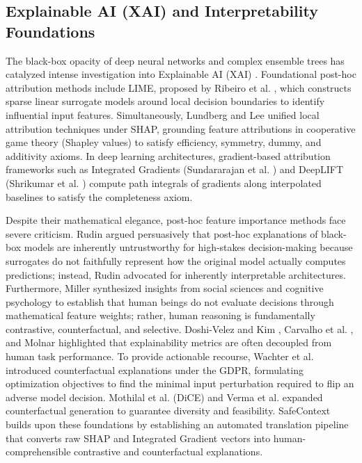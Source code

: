 \documentclass[journal]{IEEEtran}
\begin{document}
\subsection{Explainable AI (XAI) and Interpretability Foundations}
The black-box opacity of deep neural networks and complex ensemble trees has catalyzed intense investigation into Explainable AI (XAI) \cite{arrieta2020explainable, guidotti2018survey, adadi2018peeking}. Foundational post-hoc attribution methods include LIME, proposed by Ribeiro et al. \cite{ribeiro2016should}, which constructs sparse linear surrogate models around local decision boundaries to identify influential input features. Simultaneously, Lundberg and Lee \cite{lundberg2017unified} unified local attribution techniques under SHAP, grounding feature attributions in cooperative game theory (Shapley values) to satisfy efficiency, symmetry, dummy, and additivity axioms. In deep learning architectures, gradient-based attribution frameworks such as Integrated Gradients (Sundararajan et al. \cite{sundararajan2017axiomatic}) and DeepLIFT (Shrikumar et al. \cite{shrikumar2017learning}) compute path integrals of gradients along interpolated baselines to satisfy the completeness axiom.

Despite their mathematical elegance, post-hoc feature importance methods face severe criticism. Rudin \cite{rudin2019stop} argued persuasively that post-hoc explanations of black-box models are inherently untrustworthy for high-stakes decision-making because surrogates do not faithfully represent how the original model actually computes predictions; instead, Rudin advocated for inherently interpretable architectures. Furthermore, Miller \cite{miller2019explanation} synthesized insights from social sciences and cognitive psychology to establish that human beings do not evaluate decisions through mathematical feature weights; rather, human reasoning is fundamentally contrastive, counterfactual, and selective. Doshi-Velez and Kim \cite{doshivelez2017towards}, Carvalho et al. \cite{carvalho2019machine}, and Molnar \cite{molnar2020interpretable} highlighted that explainability metrics are often decoupled from human task performance. To provide actionable recourse, Wachter et al. \cite{wachter2017counterfactual} introduced counterfactual explanations under the GDPR, formulating optimization objectives to find the minimal input perturbation required to flip an adverse model decision. Mothilal et al. \cite{mothilal2020explaining} (DiCE) and Verma et al. \cite{verma2020counterfactual} expanded counterfactual generation to guarantee diversity and feasibility. SafeContext builds upon these foundations by establishing an automated translation pipeline that converts raw SHAP and Integrated Gradient vectors into human-comprehensible contrastive and counterfactual explanations.
\end{document}
